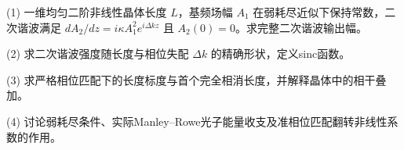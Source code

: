 (1) 一维均匀二阶非线性晶体长度 \(L\)，基频场幅 \(A_1\) 在弱耗尽近似下保持常数，二次谐波满足 \(dA_2/dz=i\kappa A_1^2e^{i\Delta kz}\) 且 \(A_2(0)=0\)。求完整二次谐波输出幅。

(2) 求二次谐波强度随长度与相位失配 \(\Delta k\) 的精确形状，定义sinc函数。

(3) 求严格相位匹配下的长度标度与首个完全相消长度，并解释晶体中的相干叠加。

(4) 讨论弱耗尽条件、实际Manley–Rowe光子能量收支及准相位匹配翻转非线性系数的作用。
